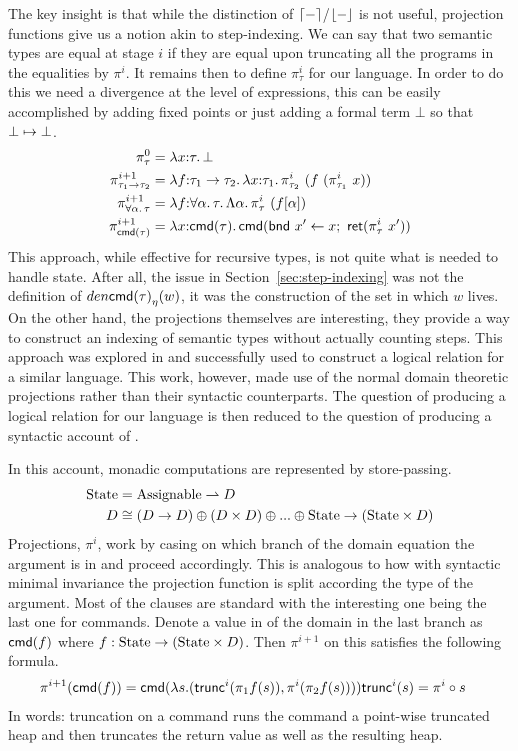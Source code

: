 The key insight is that while the distinction of
$\lceil - \rceil$/$\lfloor - \rfloor$ is not useful, projection functions
give us a notion akin to step-indexing. We can say that two semantic
types are equal at stage $i$ if they are equal upon truncating all the
programs in the equalities by $\pi^i$. It remains then to define
$\pi_\tau^i$ for our language. In order to do this we need a
divergence at the level of expressions, this can be easily
accomplished by adding fixed points or just adding a formal term
$\bot$ so that $\bot \mapsto \bot$.
\begin{align*}
  \pi_\tau^0 &= \lambda x {:} \tau.\, \bot\\
  \pi_{\tau_1 \to \tau_2}^{i + 1} &=
  \lambda f {:} \tau_1 \to \tau_2.\, \lambda x {:} \tau_1.\, \pi_{\tau_2}^i\ (f\ (\pi_{\tau_1}^i\ x))\\
  \pi_{\forall \alpha.\, \tau}^{i + 1} &=
  \lambda f {:} \forall \alpha.\, \tau.\, \Lambda \alpha.\, \pi_\tau^i\ (f[\alpha])\\
  \pi_{\mathsf{cmd}(\tau)}^{i + 1} &=
  \lambda x {:} \mathsf{cmd}(\tau).\, \mathsf{cmd}(\mathsf{bnd}\ x' \gets x;\ \mathsf{ret}(\pi_\tau^i\ x'))
\end{align*}
This approach, while effective for recursive types, is not quite what
is needed to handle state. After all, the issue in
Section~\ref{sec:step-indexing} was not the definition of
$den{\mathsf{cmd}(\tau)}_\eta(w)$, it was the construction of the set in which
$w$ lives. On the other hand, the projections themselves are
interesting, they provide a way to construct an indexing of semantic
types without actually counting steps. This approach was explored in
\citet{Birkedal:domain:10} and successfully used to construct a
logical relation for a similar language. This work, however, made use
of the normal domain theoretic projections rather than their syntactic
counterparts. The question of producing a logical relation for our
language is then reduced to the question of producing a syntactic
account of \citet{Birkedal:domains:10}.

In this account, monadic computations are represented by
store-passing.
\begin{align*}
  \mathrm{State} &= \mathrm{Assignable} \rightharpoonup D\\
  D &\cong (D \to D) \oplus (D \times D) \oplus ... \oplus \mathrm{State} \to (\mathrm{State} \times D)
\end{align*}
Projections, $\pi^i$, work by casing on which branch of the domain
equation the argument is in and proceed accordingly. This is analogous
to how with syntactic minimal invariance the projection function is
split according the type of the argument. Most of the clauses are
standard with the interesting one being the last one for
commands. Denote a value in of the domain in the last branch as
$\mathsf{cmd}(f)$ where $f : \mathrm{State} \to (\mathrm{State} \times D)$. Then
$\pi^{i + 1}$ on this satisfies the following formula.
\begin{align*}
  \pi^{i + 1}(\mathsf{cmd}(f)) &=
  \mathsf{cmd}(\lambda s. (\mathsf{trunc}^i(\pi_1 f(s)), \pi^i(\pi_2 f(s))))
  \mathsf{trunc}^i(s) = \pi^i \circ s
\end{align*}
In words: truncation on a command runs the command a point-wise
truncated heap and then truncates the return value as well as the
resulting heap.

